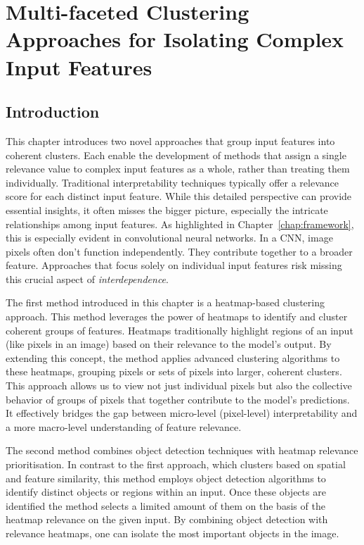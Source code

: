 \chapter{Multi-faceted Clustering Approaches for Isolating Complex Input Features}
\label{chap:clustering}
\section{Introduction}

This chapter introduces two novel approaches that group input features into coherent clusters. Each enable the development of methods that assign a single relevance value to complex input features as a whole, rather than treating them individually. Traditional interpretability techniques typically offer a relevance score for each distinct input feature. While this detailed perspective can provide essential insights, it often misses the bigger picture, especially the intricate relationships among input features. As highlighted in Chapter~\ref{chap:framework}, this is especially evident in convolutional neural networks. In a CNN, image pixels often don't function independently. They contribute together to a broader feature. Approaches that focus solely on individual input features risk missing this crucial aspect of \textit{interdependence}.

The first method introduced in this chapter is a heatmap-based clustering approach. This method leverages the power of heatmaps to identify and cluster coherent groups of features. Heatmaps traditionally highlight regions of an input (like pixels in an image) based on their relevance to the model's output. By extending this concept, the method applies advanced clustering algorithms to these heatmaps, grouping pixels or sets of pixels into larger, coherent clusters. This approach allows us to view not just individual pixels but also the collective behavior of groups of pixels that together contribute to the model's predictions. It effectively bridges the gap between micro-level (pixel-level) interpretability and a more macro-level understanding of feature relevance.

The second method combines object detection techniques with heatmap relevance prioritisation. In contrast to the first approach, which clusters based on spatial and feature similarity, this method employs object detection algorithms to identify distinct objects or regions within an input. Once these objects are identified the method selects a limited amount of them on the basis of the heatmap relevance on the given input. By combining object detection with relevance heatmaps, one can isolate the most important objects in the image.

